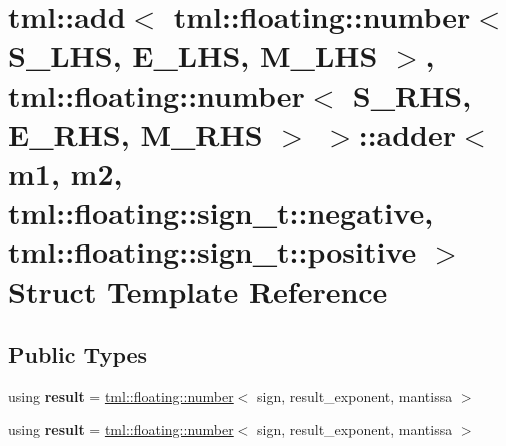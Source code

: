 \hypertarget{structtml_1_1add_3_01tml_1_1floating_1_1number_3_01S__LHS_00_01E__LHS_00_01M__LHS_01_4_00_01tml_4dda86a747ce1a075c2409981eace838}{\section{tml\+:\+:add$<$ tml\+:\+:floating\+:\+:number$<$ S\+\_\+\+L\+H\+S, E\+\_\+\+L\+H\+S, M\+\_\+\+L\+H\+S $>$, tml\+:\+:floating\+:\+:number$<$ S\+\_\+\+R\+H\+S, E\+\_\+\+R\+H\+S, M\+\_\+\+R\+H\+S $>$ $>$\+:\+:adder$<$ m1, m2, tml\+:\+:floating\+:\+:sign\+\_\+t\+:\+:negative, tml\+:\+:floating\+:\+:sign\+\_\+t\+:\+:positive $>$ Struct Template Reference}
\label{structtml_1_1add_3_01tml_1_1floating_1_1number_3_01S__LHS_00_01E__LHS_00_01M__LHS_01_4_00_01tml_4dda86a747ce1a075c2409981eace838}
}
\subsection*{Public Types}
\begin{DoxyCompactItemize}
\item 
\hypertarget{structtml_1_1add_3_01tml_1_1floating_1_1number_3_01S__LHS_00_01E__LHS_00_01M__LHS_01_4_00_01tml_4dda86a747ce1a075c2409981eace838_a28553c41d3cdc437bf4ff98dc7257956}{using {\bfseries result} = \hyperlink{structtml_1_1floating_1_1number}{tml\+::floating\+::number}$<$ sign, result\+\_\+exponent, mantissa $>$}\label{structtml_1_1add_3_01tml_1_1floating_1_1number_3_01S__LHS_00_01E__LHS_00_01M__LHS_01_4_00_01tml_4dda86a747ce1a075c2409981eace838_a28553c41d3cdc437bf4ff98dc7257956}

\item 
\hypertarget{structtml_1_1add_3_01tml_1_1floating_1_1number_3_01S__LHS_00_01E__LHS_00_01M__LHS_01_4_00_01tml_4dda86a747ce1a075c2409981eace838_a28553c41d3cdc437bf4ff98dc7257956}{using {\bfseries result} = \hyperlink{structtml_1_1floating_1_1number}{tml\+::floating\+::number}$<$ sign, result\+\_\+exponent, mantissa $>$}\label{structtml_1_1add_3_01tml_1_1floating_1_1number_3_01S__LHS_00_01E__LHS_00_01M__LHS_01_4_00_01tml_4dda86a747ce1a075c2409981eace838_a28553c41d3cdc437bf4ff98dc7257956}

\end{DoxyCompactItemize}
